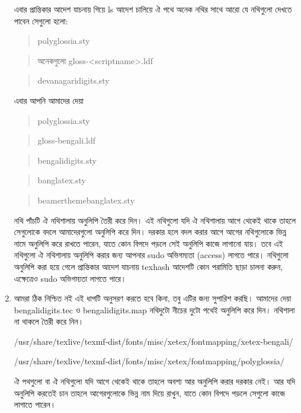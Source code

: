\documentclass[a4paper,10pt,xetex]{article}
\begin{document}
\begin{enumerate}
এবার প্রান্তিকার আদেশ যাচনায় গিয়ে ls আদেশ চালিয়ে ঐ পথে অনেক নথির সাথে আরো যে নথিগুলো দেখতে পাবেন সেগুলো হলো: \begin{quote}polyglossia.sty\end{quote} \begin{quote}অনেকগুলো gloss-<scriptname>.ldf\end{quote} \begin{quote}devanagaridigits.sty\end{quote} এবার আপনি আমাদের দেয়া   
\begin{quote}polyglossia.sty\end{quote}\begin{quote}gloss-bengali.ldf\end{quote}\begin{quote}bengalidigits.sty\end{quote}\begin{quote}banglatex.sty\end{quote} \begin{quote}beamerthemebanglatex.sty\end{quote} নথি পাঁচটি ঐ  নথিশালায় অনুলিপি তৈরী করে দিন। এই নথিগুলো যদি ঐ নথিশালায় আগে থেকেই থাকে তাহলে সেগুলোকে বদলে আমাদেরগুলো অনুলিপি করে দিন। দরকার হলে বদল করার আগে আগের নথিগুলোকে ভিন্ন নামে অনুলিপি করে রাখতে পারেন, যাতে কোন বিপদে পড়লে সেই অনুলিপি কাজে লাগানো যায়। তবে এই নথিগুলো ঐ নথিশালায় অনুলিপি করার জন্য আপনার sudo অভিগম্যতা (access) লাগতে পারে। নথিগুলো অনুলিপি করা হয়ে গেলে প্রান্তিকার আদেশ যাচনায় texhash আদেশটি কোন পরামিতি ছাড়া চালনা করুন, এক্ষেত্রেও sudo অভিগম্যতা লাগতে পারে।

\item আমরা ঠিক নিশ্চিত নই এই ধাপটি অনুসরণ করতে হবে কিনা, তবু এটির জন্য সুপারিশ করছি। আমাদের দেয়া bengalidigits.tec ও bengalidigits.map নথিদুটো নীচের দুটো পথেই অনুলিপি করে দিন।  নথিশালা না থাকলে তৈরী করে নিন।
\begin{scriptsize}\begin{center}‌/usr/share/texlive/texmf-dist/fonts/misc/xetex/fontmapping/xetex-bengali/\end{center}\end{scriptsize}\begin{scriptsize}\begin{center}/usr/share/texlive/texmf-dist/fonts/misc/xetex/fontmapping/polyglossia/\end{center}\end{scriptsize}
ঐ পথগুলো বা ঐ নথিগুলো যদি আগে থেকেই থাকে তাহলে অবশ্য আর অনুলিপি করার দরকার নেই। আর যদি অনুলিপি করতেই চান তাহলে আগেরগুলোকে ভিন্ন নাম দিয়ে রাখুন, যাতে কোন বিপদে পড়লে সেগুলো কাজে লাগাতে পারেন।


\end{enumerate}
\end{document}
